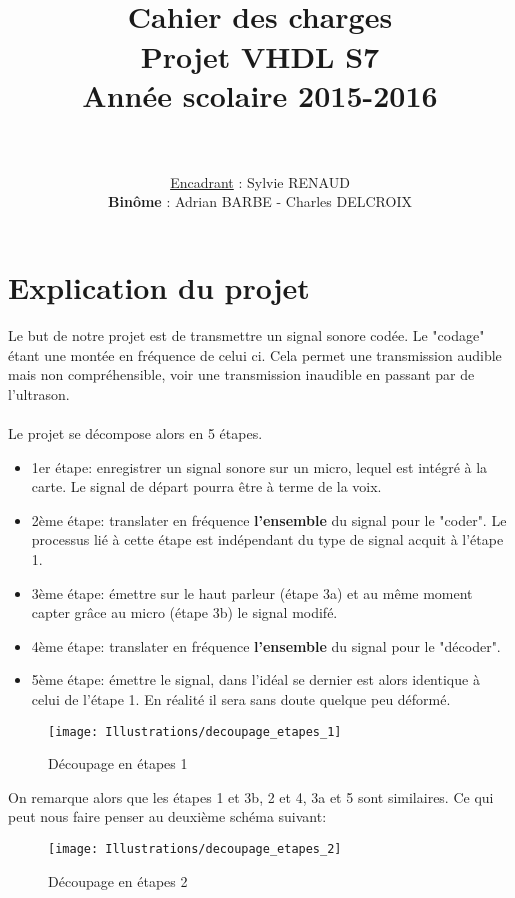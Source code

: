 \documentclass[paper=a4, fontsize=12pt]{article}
\title{
  \usefont{OT1}{bch}{b}{n}
  \horrule{1.5pt} \\[0.5cm]	
  \Huge \textbf{Cahier des charges} \\ [10pt]
  \Huge Projet VHDL S7\\ [15pt]
  \LARGE Année scolaire 2015-2016 \\ 
  \horrule{1.5pt} \\[0.5cm]
}
\author{
  \huge \underline{Encadrant} : \LARGE Sylvie RENAUD\\[20pt]
  \normalfont 							
  \huge \textbf{Binôme} : \Large Adrian BARBE - Charles DELCROIX \\[5pt]
		\normalsize
}
\date{}
\numberwithin{equation}{section}		%
\numberwithin{figure}{section}			%
\numberwithin{table}{section}				%
\begin{document}
\maketitle
\newpage

\tableofcontents

\newpage

\section{Explication du projet}

Le but de notre projet est de transmettre un signal sonore codée. Le "codage" étant une montée en fréquence de celui ci.
Cela permet une transmission audible mais non compréhensible, voir une transmission inaudible en passant par de l'ultrason.
\\\\Le projet se décompose alors en 5 étapes.
\begin{itemize}[label=$\square$,leftmargin=* ,parsep=0cm,itemsep=0cm,topsep=0cm]
\item 1er étape: enregistrer un signal sonore sur un micro, lequel est intégré à la carte. Le signal de départ pourra être à terme de la voix.
\item 2ème étape: translater en fréquence \textbf{l'ensemble} du signal pour le "coder". Le processus lié à cette étape est indépendant du type de signal acquit à l'étape 1.
\item 3ème étape: émettre sur le haut parleur (étape 3a) et au même moment capter grâce au micro (étape 3b) le signal modifé.
\item 4ème étape: translater en fréquence \textbf{l'ensemble} du signal pour le "décoder".
\item 5ème étape: émettre le signal, dans l'idéal se dernier est alors identique à celui de l'étape 1. En réalité il sera sans doute quelque peu déformé.
\end{itemize}
\begin{figure}[h!]
\centerline{\texttt{[image: Illustrations/decoupage\_etapes\_1]}}
\caption{\label{Illustrations/decoupage_etapes_1} Découpage en étapes 1}
\end{figure}

On remarque alors que les étapes 1 et 3b, 2 et 4, 3a et 5 sont similaires. Ce qui peut nous faire penser au deuxième schéma suivant:

\begin{figure}[h!]
\centerline{\texttt{[image: Illustrations/decoupage\_etapes\_2]}}
\caption{\label{Illustrations/decoupage_etapes_2} Découpage en étapes 2}
\end{figure}
\end{document}
